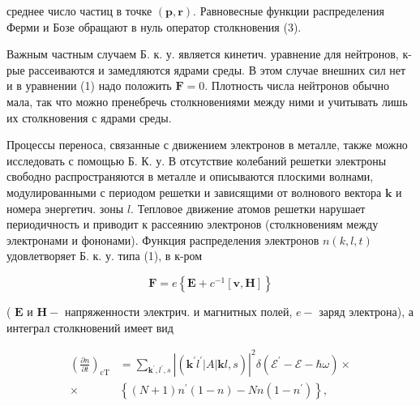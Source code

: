 \documentclass[10pt]{article}
\begin{document}
среднее число частиц в точке $(\boldsymbol{p}, \boldsymbol{r})$. Равновесные функции распределения Ферми и Бозе обращают в нуль оператор столкновения (3).



Важным частным случаем Б. к. у. является кинетич. уравнение для нейтронов, к-рые рассеиваются и замедляются ядрами среды. В этом случае внешних сил нет и в уравнении (1) надо положить $\boldsymbol{F}=0$. Плотность числа нейтронов обычно мала, так что можно пренебречь столкновениями между ними и учитывать лишь их столкновения с ядрами среды.



Процессы переноса, связанные с движением электронов в металле, также можно исследовать с помощью Б. К. у. В отсутствие колебаний решетки электроны свободно распространяются в металле и описываются плоскими волнами, модулированными с периодом решетки и зависящими от волнового вектора $\boldsymbol{k}$ и номера энергетич. зоны $l$. Тепловое движение атомов решетки нарушает периодичность и приводит к рассеянию электронов (столкновениям между электронами и фононами). Функция распределения электронов $n(k, l, t)$ удовлетворяет Б. к. у. типа (1), в к-ром



\[

\boldsymbol{F}=e\left\{\boldsymbol{E}+c^{-1}[\boldsymbol{v}, \boldsymbol{H}]\right\}

\]



( $\boldsymbol{E}$ и $\boldsymbol{H}-$ напряженности электрич. и магнитных полей, $e-$ заряд электрона), а интеграл столкновений имеет вид



\[

\begin{aligned}

\left(\frac{\partial n}{\partial t}\right)_{\mathrm{cT}} & =\sum_{\boldsymbol{k}^{\prime}, l^{\prime}, s}\left|\left(\boldsymbol{k}^{\prime} l^{\prime}|A| \boldsymbol{k} l, s\right)\right|^{2} \delta\left(\mathscr{E}^{\prime}-\mathscr{E}-\hbar \omega\right) \times \\

\times & \left\{(N+1) n^{\prime}(1-n)-N n\left(1-n^{\prime}\right)\right\},

\end{aligned}

\]
\end{document}
